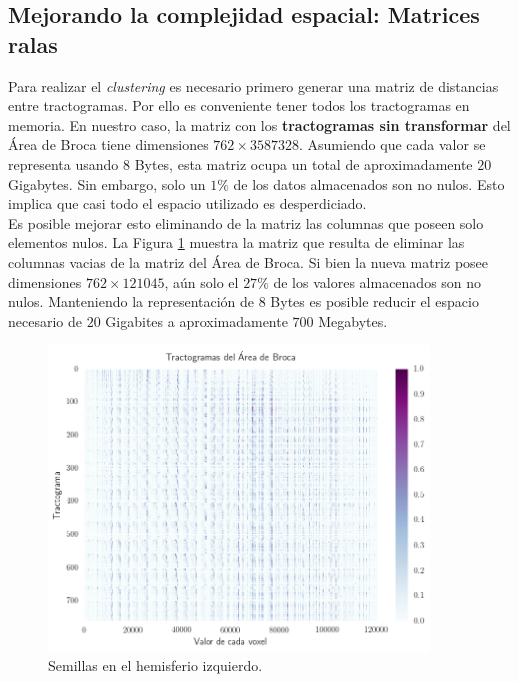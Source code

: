 \subsection{Mejorando la complejidad espacial: Matrices ralas}
\label{sec:ralas}

Para realizar el \textit{clustering} es necesario primero generar una matriz de
distancias entre tractogramas. Por ello es conveniente tener todos 
los tractogramas en memoria. En nuestro caso, la matriz con los \textbf{tractogramas
sin transformar} del \'Area de Broca tiene dimensiones $762\times3587328$. 
Asumiendo que cada valor se representa usando $8$ Bytes, esta matriz ocupa un 
total de aproximadamente $20$ Gigabytes. Sin embargo, solo un $1\%$ de los datos
almacenados son no nulos. Esto implica que casi todo el espacio utilizado es
desperdiciado. \\

Es posible mejorar esto eliminando de la matriz las columnas que poseen solo
elementos nulos. La Figura \ref{fig:densa} muestra la matriz que resulta de
eliminar las columnas vacias de la matriz del \'Area de Broca. Si bien la nueva
matriz posee dimensiones $762\times121045$, a\'un solo el $27\%$ de los valores 
almacenados son no nulos. Manteniendo la representaci\'on de $8$ Bytes es posible
reducir el espacio necesario de $20$ Gigabites a aproximadamente $700$ Megabytes.\\

\begin{figure}[h!]
   \centering
    \includegraphics[width=0.9\textwidth]{img/densa_broca.png}
    \caption{Semillas en el hemisferio izquierdo. }
    \label{fig:densa}
\end{figure}

